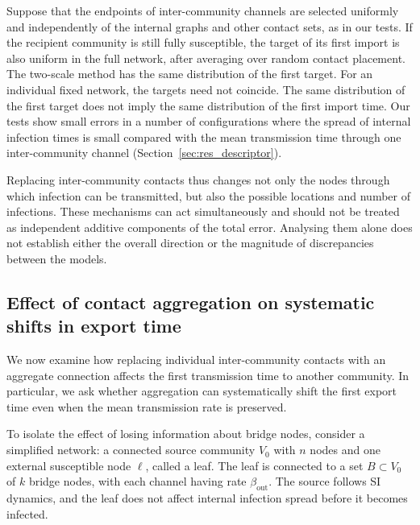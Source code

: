 \documentclass[a4paper,fleqn]{cas-sc}
\begin{document}
\begin{remark}
\label{rem:placement}
Suppose that the endpoints of inter-community channels are selected uniformly and independently of the internal graphs and other contact sets, as in our tests. If the recipient community is still fully susceptible, the target of its first import is also uniform in the full network, after averaging over random contact placement. The two-scale method has the same distribution of the first target. For an individual fixed network, the targets need not coincide. The same distribution of the first target does not imply the same distribution of the first import time. Our tests show small errors in a number of configurations where the spread of internal infection times is small compared with the mean transmission time through one inter-community channel (Section~\ref{sec:res_descriptor}).
\end{remark}

Replacing inter-community contacts thus changes not only the nodes through which infection can be transmitted, but also the possible locations and number of infections. These mechanisms can act simultaneously and should not be treated as independent additive components of the total error. Analysing them alone does not establish either the overall direction or the magnitude of discrepancies between the models.

\subsection{Effect of contact aggregation on systematic shifts in export time}
\label{sec:single_export}

We now examine how replacing individual inter-community contacts with an aggregate connection affects the first transmission time to another community. In particular, we ask whether aggregation can systematically shift the first export time even when the mean transmission rate is preserved.

To isolate the effect of losing information about bridge nodes, consider a simplified network: a connected source community $V_0$ with $n$ nodes and one external susceptible node $\ell$, called a leaf. The leaf is connected to a set $B\subset V_0$ of $k$ bridge nodes, with each channel having rate $\beta_{\mathrm{out}}$. The source follows SI dynamics, and the leaf does not affect internal infection spread before it becomes infected.
\end{document}
